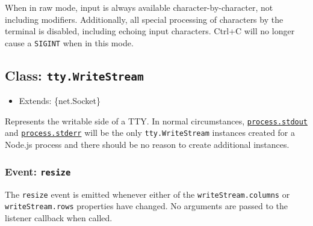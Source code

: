 When in raw mode, input is always available character-by-character, not
including modifiers. Additionally, all special processing of characters
by the terminal is disabled, including echoing input characters. Ctrl+C
will no longer cause a \texttt{SIGINT} when in this mode.

\subsection{\texorpdfstring{Class:
\texttt{tty.WriteStream}}{Class: tty.WriteStream}}\label{class-tty.writestream}

\begin{itemize}
\tightlist
\item
  Extends: \{net.Socket\}
\end{itemize}

Represents the writable side of a TTY. In normal circumstances,
\href{process.md\#processstdout}{\texttt{process.stdout}} and
\href{process.md\#processstderr}{\texttt{process.stderr}} will be the
only \texttt{tty.WriteStream} instances created for a Node.js process
and there should be no reason to create additional instances.

\subsubsection{\texorpdfstring{Event:
\texttt{\textquotesingle{}resize\textquotesingle{}}}{Event: \textquotesingle resize\textquotesingle{}}}\label{event-resize}

The \texttt{\textquotesingle{}resize\textquotesingle{}} event is emitted
whenever either of the \texttt{writeStream.columns} or
\texttt{writeStream.rows} properties have changed. No arguments are
passed to the listener callback when called.

\begin{Shaded}
\begin{Highlighting}[]
\NormalTok{(}\OperatorTok{,}\NormalTok{ () }\KeywordTok{=\textgreater{}}\NormalTok{ \{}
  \NormalTok{(}\NormalTok{)}\OperatorTok{;}
  \NormalTok{(}\VerbatimStringTok{\textasciigrave{}}\SpecialCharTok{$\{}\SpecialCharTok{\}}\SpecialCharTok{$\{}\SpecialCharTok{\}}\VerbatimStringTok{\textasciigrave{}}\NormalTok{)}\OperatorTok{;}
\NormalTok{\})}\OperatorTok{;}
\end{Highlighting}
\end{Shaded}

